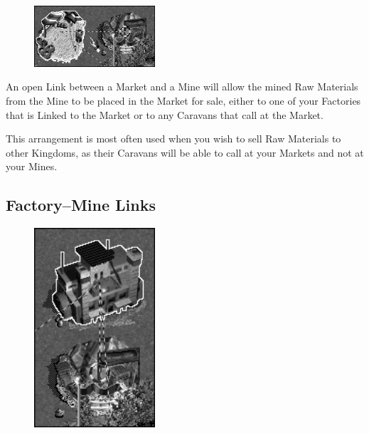 \begin{figure}
	\vspace{-20pt}
	\begin{center}
		\includegraphics[width=0.4\textwidth]{Ilink_marketmine}
	\end{center}
	\vspace{-20pt}
\end{figure}

An open Link between a Market and a Mine will allow the mined Raw Materials from the Mine to be placed in the Market for sale, either to one of your Factories that is Linked to the Market or to any Caravans that call at the Market.

This arrangement is most often used when you wish to sell Raw Materials to other Kingdoms, as their Caravans will be able to call at your Markets and not at your Mines.

\subsection{Factory–Mine Links}

\begin{figure}
	\vspace{-20pt}
	\begin{center}
		\includegraphics[width=0.4\textwidth]{Ilink_minefactory}
	\end{center}
	\vspace{-20pt}
\end{figure}

